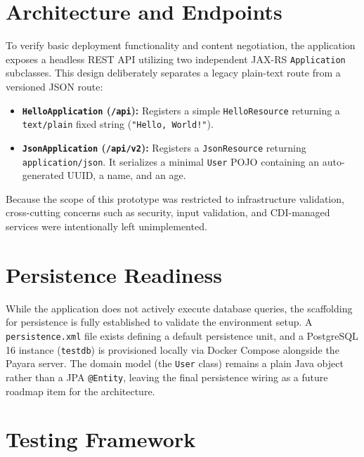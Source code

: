 \section{Architecture and Endpoints}
\label{app:proto1-arch}

To verify basic deployment functionality and content negotiation, the
application exposes a headless \ac{REST} \ac{API} utilizing two independent
\ac{JAX-RS} \texttt{Application} subclasses. This design deliberately separates
a legacy plain-text route from a versioned \ac{JSON} route:

\begin{itemize}
	\item \textbf{\texttt{HelloApplication} (\texttt{/api}):} Registers a
		simple \texttt{HelloResource} returning a \texttt{text/plain} fixed
		string (\texttt{"Hello, World!"}).

	\item \textbf{\texttt{JsonApplication} (\texttt{/api/v2}):} Registers a
		\texttt{JsonResource} returning \texttt{application/json}. It serializes
		a minimal \texttt{User} \ac{POJO} containing an auto-generated UUID, a
		name, and an age.
\end{itemize}

Because the scope of this prototype was restricted to infrastructure validation,
cross-cutting concerns such as security, input validation, and \ac{CDI}-managed
services were intentionally left unimplemented.

\section{Persistence Readiness}
\label{app:proto1-persistence}

While the application does not actively execute database queries, the scaffolding
for persistence is fully established to validate the environment setup. A
\texttt{persistence.xml} file exists defining a default persistence unit,
and a PostgreSQL 16 instance (\texttt{testdb}) is provisioned locally via Docker
Compose alongside the Payara server. The domain model (the \texttt{User}
class) remains a plain Java object rather than a \ac{JPA} \texttt{@Entity},
leaving the final persistence wiring as a future roadmap item for the
architecture.

\section{Testing Framework}
\label{app:proto1-testing}

